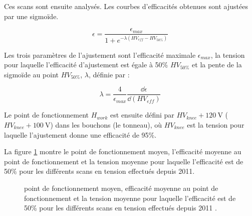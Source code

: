 Ces scans sont ensuite analysés. Les courbes d'efficacités obtenues sont ajustées par une sigmoïde.

\begin{equation}
\epsilon=\frac{\epsilon_{max}}{1+e^{-\lambda\left(HV_{eff}-HV_{50\%}\right)}}
\end{equation}

Les trois paramètres de l'ajustement sont l'efficacité maximale $\epsilon_{max}$, la tension pour laquelle l'efficacité d'ajustement est égale à \num{50}\% $HV_{50\%}$ et la pente de la sigmoïde au point $HV_{50\%}$, $\lambda$, définie par :

\begin{equation}
\lambda=\frac{4}{\epsilon_{max}}\frac{\dd \epsilon}{\dd \left(HV_{eff}\right)}
\end{equation}

Le point de fonctionnement $H_{work}$ est ensuite défini par $HV_{knee}+\SI{120}{\volt}$ ($HV_{knee}+\SI{100}{\volt}$) dans les bouchons (le tonneau), où $HV_{knee}$ est la tension pour laquelle l'ajustement donne une efficacité de 95\%.

La figure \ref{working} montre le point de fonctionnement moyen, l'efficacité moyenne au point de fonctionnement et la tension moyenne pour laquelle l'efficacité est de 50\% pour les différents scans en tension effectués depuis \num{2011}.
\vspace{0.5cm}
\begin{figure}[ht!]
	\centering
	\hfill
	\caption{point de fonctionnement moyen, efficacité moyenne au point de fonctionnement et la tension moyenne pour laquelle l'efficacité est de 50\% pour les différents scans en tension effectués depuis \num{2011} \cite{working2}.}
	\label{working}
\end{figure}
\newpage
